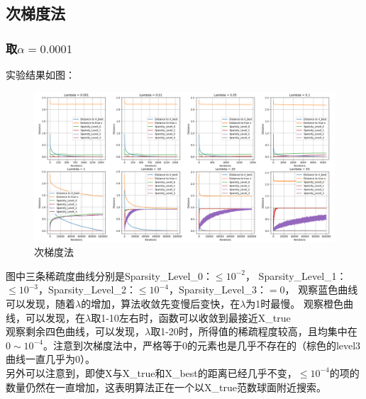 \documentclass{article}
\begin{document}
\newpage
\subsection{次梯度法}
\subsubsection{取$\alpha=0.0001$}
实验结果如图：
\begin{figure}[H]
    \centering
    \includegraphics[width=0.9\linewidth]{./images/Figure_3_1.png}
    \caption{次梯度法}
    \label{fig: img3}
\end{figure}
图中三条稀疏度曲线分别是Sparsity\_Level\_0：$\leq 10^{-2}$，
Sparsity\_Level\_1：$\leq 10^{-3}$，Sparsity\_Level\_2：$\leq 10^{-4}$，Sparsity\_Level\_3：$=0$，
观察蓝色曲线可以发现，随着$\lambda$的增加，算法收敛先变慢后变快，在$\lambda$为1时最慢。
观察橙色曲线，可以发现，在$\lambda$取1-10左右时，函数可以收敛到最接近X\_true\\
观察剩余四色曲线，可以发现，$\lambda$取1-20时，所得值的稀疏程度较高，且均集中在$0 \sim 10^{-4}$。注意到次梯度法中，严格等于0的元素也是几乎不存在的（棕色的level3曲线一直几乎为0）。\\
另外可以注意到，即使X与X\_true和X\_best的距离已经几乎不变，$\leq10^{-4}$的项的数量仍然在一直增加，这表明算法正在一个以X\_true范数球面附近搜索。
\end{document}
